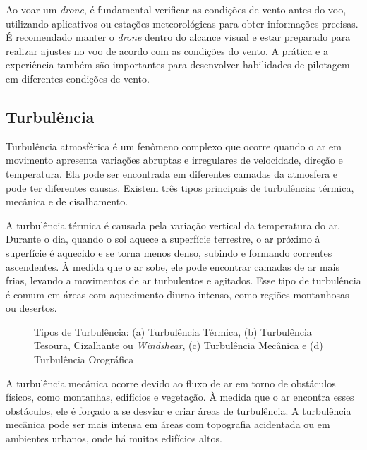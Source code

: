 \documentclass[a4paper, 12pt, onecolumn,singlespacing]{article}
\begin{document}
	Ao voar um \textit{drone}, é fundamental verificar as condições de vento antes do voo, utilizando aplicativos ou estações meteorológicas para obter informações precisas. É recomendado manter o \textit{drone} dentro do alcance visual e estar preparado para realizar ajustes no voo de acordo com as condições do vento. A prática e a experiência também são importantes para desenvolver habilidades de pilotagem em diferentes condições de vento.
	
	\subsection{Turbulência}
	
	Turbulência atmosférica é um fenômeno complexo que ocorre quando o ar em movimento apresenta variações abruptas e irregulares de velocidade, direção e temperatura. Ela pode ser encontrada em diferentes camadas da atmosfera e pode ter diferentes causas. Existem três tipos principais de turbulência: térmica, mecânica e de cisalhamento.
	
	
	A turbulência térmica é causada pela variação vertical da temperatura do ar. Durante o dia, quando o sol aquece a superfície terrestre, o ar próximo à superfície é aquecido e se torna menos denso, subindo e formando correntes ascendentes. À medida que o ar sobe, ele pode encontrar camadas de ar mais frias, levando a movimentos de ar turbulentos e agitados. Esse tipo de turbulência é comum em áreas com aquecimento diurno intenso, como regiões montanhosas ou desertos.
	
	\begin{figure}[!htb]
		 \hfill
		\vfill
		 \hfill
		\caption{Tipos de Turbulência: (a) Turbulência Térmica, (b) Turbulência Tesoura, Cizalhante ou \textit{Windshear}, (c) Turbulência Mecânica e (d) Turbulência Orográfica}
		\label{fig:tipos_turbulencia}
	
	\end{figure}
	
	A turbulência mecânica ocorre devido ao fluxo de ar em torno de obstáculos físicos, como montanhas, edifícios e vegetação. À medida que o ar encontra esses obstáculos, ele é forçado a se desviar e criar áreas de turbulência. A turbulência mecânica pode ser mais intensa em áreas com topografia acidentada ou em ambientes urbanos, onde há muitos edifícios altos.
	
\end{document}
